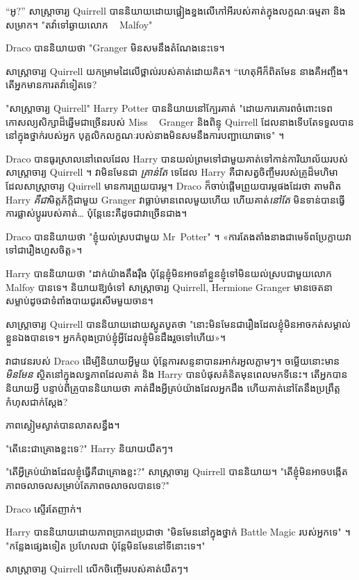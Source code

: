 {“អូ?” សាស្ត្រាចារ្យ Quirrell បាននិយាយដោយផ្អៀងខ្នងលើកៅអីរបស់គាត់ក្នុងលក្ខណៈធម្មតា និងសម្រាក។ "តវ៉ាទៅឆ្ងាយលោក ~ Malfoy"

Draco បាននិយាយថា "Granger មិនសមនឹងតំណែងនេះទេ។

សាស្ត្រាចារ្យ Quirrell យកម្រាមដៃលើថ្ពាល់របស់គាត់ដោយគិត។ “ហេតុអីក៏ពិតមែន នាងគឺអញ្ចឹង។ តើអ្នកមានការតវ៉ាទៀតទេ?

"សាស្រ្តាចារ្យ Quirrell" Harry Potter បាននិយាយនៅក្បែរគាត់ "ដោយការគោរពចំពោះទេពកោសល្យសិក្សាដ៏ឆ្នើមជាច្រើនរបស់ Miss ~ Granger និងពិន្ទុ Quirrell ដែលនាងទើបតែទទួលបាននៅក្នុងថ្នាក់របស់អ្នក បុគ្គលិកលក្ខណៈរបស់នាងមិនសមនឹងការបញ្ជាយោធាទេ" ។

Draco បានធូរស្រាលនៅពេលដែល Harry បានយល់ព្រមទៅជាមួយគាត់ទៅកាន់ការិយាល័យរបស់សាស្រ្តាចារ្យ Quirrell ។ វាមិនមែនជា \emph{គ្រាន់តែ} ទេដែល Harry គឺជាសត្វចិញ្ចឹមរបស់គ្រូដ៏មហិមា ដែលសាស្រ្តាចារ្យ Quirrell មានការព្រួយបារម្ភ។ Draco ក៏ចាប់ផ្តើមព្រួយបារម្ភផងដែរថា តាមពិត Harry \emph{គឺជា}មិត្តភ័ក្តិជាមួយ Granger វាធ្លាប់មានពេលមួយហើយ ហើយគាត់\emph{នៅតែ} មិនទាន់បានធ្វើការផ្លាស់ប្តូររបស់គាត់… ប៉ុន្តែនេះគឺដូចជាវាច្រើនជាង។

Draco បាននិយាយថា "ខ្ញុំយល់ស្របជាមួយ Mr~Potter" ។ «ការ​តែង​តាំង​នាង​ជា​មេទ័ព​ប្រែ​ក្លាយ​វា​ទៅ​ជា​រឿង​ហួស​ចិត្ត»។

Harry បាននិយាយថា "ដាក់យ៉ាងតឹងរ៉ឹង ប៉ុន្តែខ្ញុំមិនអាចនាំខ្លួនខ្ញុំទៅមិនយល់ស្របជាមួយលោក ~ Malfoy បានទេ។ និយាយឱ្យចំទៅ សាស្ត្រាចារ្យ Quirrell, Hermione Granger មានចេតនាសម្លាប់ដូចជាទំពាំងបាយជូរសើមមួយចាន។

សាស្ត្រាចារ្យ Quirrell បាននិយាយដោយស្លូតបូតថា "នោះមិនមែនជារឿងដែលខ្ញុំមិនអាចកត់សម្គាល់ខ្លួនឯងបានទេ។ អ្នក​កំពុង​ប្រាប់​ខ្ញុំ​អ្វី​ដែល​ខ្ញុំ​មិន​ដឹង​រួច​ទៅ​ហើយ»។

វា​ជា​វេន​របស់ Draco ដើម្បី​និយាយ​អ្វី​មួយ ប៉ុន្តែ​ការ​សន្ទនា​បាន​រអាក់រអួល​ភ្លាមៗ។ ចម្លើយនោះមាន \emph{មិនមែន} ស្ថិតនៅក្នុងលទ្ធភាពដែលគាត់ និង Harry បានបំផុសគំនិតមុនពេលមកទីនេះ។ តើអ្នកបាននិយាយអ្វី \emph{} បន្ទាប់ពីគ្រូបាននិយាយថា គាត់ដឹងអ្វីគ្រប់យ៉ាងដែលអ្នកដឹង ហើយគាត់នៅតែនឹងប្រព្រឹត្តកំហុសជាក់ស្តែង?

ភាពស្ងៀមស្ងាត់បានលាតសន្ធឹង។

"តើនេះជាគ្រោងខ្លះទេ?" Harry និយាយយឺតៗ។

"តើអ្វីគ្រប់យ៉ាងដែលខ្ញុំធ្វើគឺជាគ្រោងខ្លះ?" សាស្ត្រាចារ្យ Quirrell បាននិយាយ។ "តើខ្ញុំមិនអាចបង្កើតភាពចលាចលសម្រាប់តែភាពចលាចលបានទេ?"

Draco ស្ទើរតែញាក់។

Harry បាននិយាយដោយភាពប្រាកដប្រជាថា "មិនមែននៅក្នុងថ្នាក់ Battle Magic របស់អ្នកទេ" ។ "កន្លែងផ្សេងទៀត ប្រហែលជា ប៉ុន្តែមិនមែននៅទីនោះទេ។"

សាស្រ្តាចារ្យ Quirrell លើកចិញ្ចើមរបស់គាត់យឺតៗ។

}
